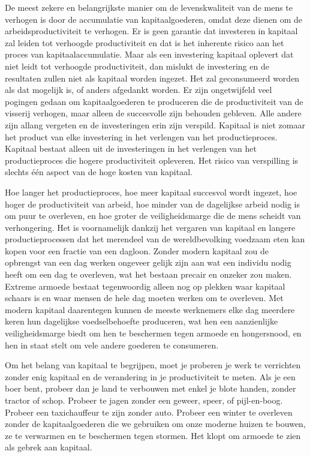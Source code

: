 De meest zekere en belangrijkste manier om de levenskwaliteit van de mens te verhogen is door de accumulatie van kapitaalgoederen, omdat deze dienen om de arbeidsproductiviteit te verhogen. Er is geen garantie dat investeren in kapitaal zal leiden tot verhoogde productiviteit en dat is het inherente risico aan het proces van kapitaalaccumulatie. Maar als een investering kapitaal oplevert dat niet leidt tot verhoogde productiviteit, dan mislukt de investering en de resultaten zullen niet als kapitaal worden ingezet. Het zal geconsumeerd worden als dat mogelijk is, of anders afgedankt worden. Er zijn ongetwijfeld veel pogingen gedaan om kapitaalgoederen te produceren die de productiviteit van de visserij verhogen, maar alleen de succesvolle zijn behouden gebleven. Alle andere zijn allang vergeten en de investeringen erin zijn verspild. Kapitaal is niet zomaar het product van elke investering in het verlengen van het productieproces. Kapitaal bestaat alleen uit de investeringen in het verlengen van het productieproces die hogere productiviteit opleveren. Het risico van verspilling is slechts één aspect van de hoge kosten van kapitaal.

Hoe langer het productieproces, hoe meer kapitaal succesvol wordt ingezet, hoe hoger de productiviteit van arbeid, hoe minder van de dagelijkse arbeid nodig is om puur te overleven, en hoe groter de veiligheidsmarge die de mens scheidt van verhongering. Het is voornamelijk dankzij het vergaren van kapitaal en langere productieprocessen dat het merendeel van de wereldbevolking voedzaam eten kan kopen voor een fractie van een dagloon. Zonder modern kapitaal zou de opbrengst van een dag werken ongeveer gelijk zijn aan wat een individu nodig heeft om een dag te overleven, wat het bestaan precair en onzeker zou maken. Extreme armoede bestaat tegenwoordig alleen nog op plekken waar kapitaal schaars is en waar mensen de hele dag moeten werken om te overleven. Met modern kapitaal daarentegen kunnen de meeste werknemers elke dag meerdere keren hun dagelijkse voedselbehoefte produceren, wat hen een aanzienlijke veiligheidsmarge biedt om hen te beschermen tegen armoede en hongersnood, en hen in staat stelt om vele andere goederen te consumeren.

Om het belang van kapitaal te begrijpen, moet je proberen je werk te verrichten zonder enig kapitaal en de verandering in je productiviteit te meten. Als je een boer bent, probeer dan je land te verbouwen met enkel je blote handen, zonder tractor of schop. Probeer te jagen zonder een geweer, speer, of pijl-en-boog. Probeer een taxichauffeur te zijn zonder auto. Probeer een winter te overleven zonder de kapitaalgoederen die we gebruiken om onze moderne huizen te bouwen, ze te verwarmen en te beschermen tegen stormen. Het klopt om armoede te zien als gebrek aan kapitaal.

